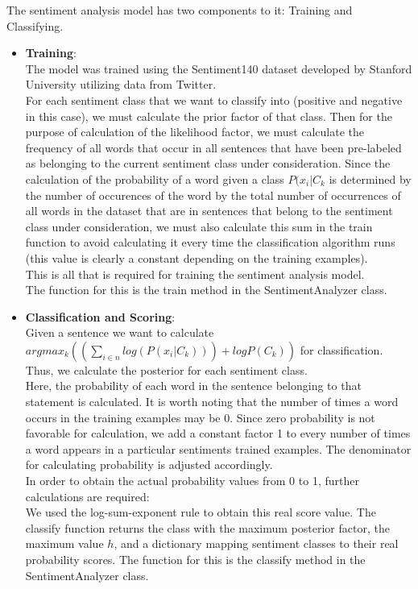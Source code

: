 \documentclass[fontsize=11pt]{article}
\begin{document}
The sentiment analysis model has two components to it: Training and Classifying.\\
\begin{itemize}
    \item \textbf{Training}:\\ The model was trained using the Sentiment140 dataset developed by Stanford University utilizing data from Twitter.\\ For each sentiment class that we want to classify into (positive and negative in this case), we must calculate the prior factor of that class. Then for the purpose of calculation of the likelihood factor, we must calculate the frequency of all words that occur in all sentences that have been pre-labeled as belonging to the current sentiment class under consideration. Since the calculation of the probability of a word given a class $P(x_{i}|C_{k}$ is determined by the number of occurences of the word by the total number of occurrences of all words in the dataset that are in sentences that belong to the sentiment class under consideration, we must also calculate this sum in the train function to avoid calculating it every time the classification algorithm runs (this value is clearly a constant depending on the training examples).\\ This is all that is required for training the sentiment analysis model.\\
    The function for this is the train method in the SentimentAnalyzer class.
    \item \textbf{Classification and Scoring}:\\ Given a sentence we want to calculate $argmax_{k}((\sum_{i\in n}log(P(x_{i}|C_{k}))) + logP(C_{k}))$ for classification. Thus, we calculate the posterior for each sentiment class.\\ Here, the probability of each word in the sentence belonging to that statement is calculated. It is worth noting that the number of times a word occurs in the training examples may be 0. Since zero probability is not favorable for calculation, we add a constant factor 1 to every number of times a word appears in a particular sentiments trained examples. The denominator for calculating probability is adjusted accordingly. \\ In order to obtain the actual probability values from 0 to 1, further calculations are required:\\ We used the log-sum-exponent rule to obtain this real score value. The classify function returns the class with the maximum posterior factor, the maximum value $h$, and a dictionary mapping sentiment classes to their real probability scores.
    The function for this is the classify method in the SentimentAnalyzer class.
\end{itemize}
\end{document}
